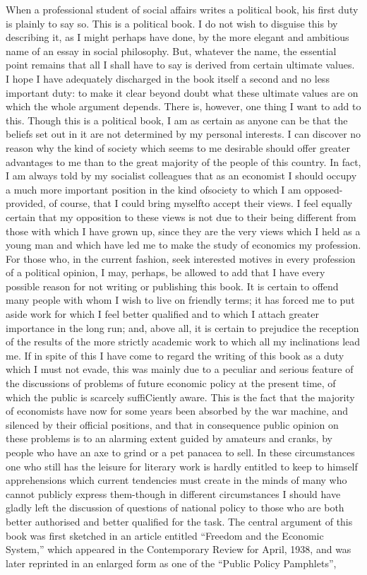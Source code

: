 \documentclass[11pt,openany]{book}
\begin{document}
When a professional student of social affairs writes a political book, his first duty is plainly to say so. This is a political book. I do not wish to disguise this by describing it, as I might perhaps have done, by the more elegant and ambitious name of an essay in social philosophy. But, whatever the name, the essential point remains that all I shall have to say is derived from certain ultimate values. I hope I have adequately discharged in the book itself a second and no less important duty: to make it clear beyond doubt what these ultimate values are on which the whole argument depends. There is, however, one thing I want to add to this. Though this is a political book, I am as certain as anyone can be that the beliefs set out in it are not determined by my personal interests. I can discover no reason why the kind of society which seems to me desirable should offer greater advantages to me than to the great majority of the people of this country. In fact, I am always told by my socialist colleagues that as an economist I should occupy a much more important position in the kind ofsociety to which I am opposed-provided, of course, that I could bring myselfto accept their views. I feel equally certain that my opposition to these views is not due to their being different from those with which I have grown up, since they are the very views which I held as a young man and which have led me to make the study of economics my profession. For those who, in the current fashion, seek interested motives in every profession of a political opinion, I may, perhaps, be allowed to add that I have every possible reason for not writing or publishing this book. It is certain to offend many people with whom I wish to live on friendly terms; it has forced me to put aside work for which I feel better qualified and to which I attach greater importance in the long run; and, above all, it is certain to prejudice the reception of the results of the more strictly academic work to which all my inclinations lead me. If in spite of this I have come to regard the writing of this book as a duty which I must not evade, this was mainly due to a peculiar and serious feature of the discussions of problems of future economic policy at the present time, of which the public is scarcely suffiCiently aware. This is the fact that the majority of economists have now for some years been absorbed by the war machine, and silenced by their official positions, and that in consequence public opinion on these problems is to an alarming extent guided by amateurs and cranks, by people who have an axe to grind or a pet panacea to sell. In these circumstances one who still has the leisure for literary work is hardly entitled to keep to himself apprehensions which current tendencies must create in the minds of many who cannot publicly express them-though in different circumstances I should have gladly left the discussion of questions of national policy to those who are both better authorised and better qualified for the task. The central argument of this book was first sketched in an article entitled ``Freedom and the Economic System,'' which appeared in the Contemporary Review for April, 1938, and was later reprinted in an enlarged form as one of the ``Public Policy Pamphlets'',
\end{document}
